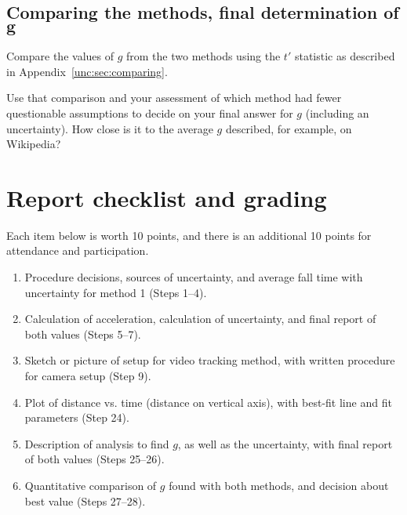 \subsection{Comparing the methods, final determination of $\bm{g}$}

\begin{steps}
	\item Compare the values of $g$ from the two methods using the $t'$ statistic as described in Appendix~\ref{unc:sec:comparing}.
	
	\item Use that comparison and your assessment of which method had fewer questionable assumptions to decide on your final answer for $g$ (including an uncertainty). How close is it to the average $g$ described, for example, on Wikipedia?
\end{steps}

\section{Report checklist and grading}

Each item below is worth 10 points, and there is an additional 10 points for attendance and participation.

\begin{enumerate}
	\item Procedure decisions, sources of uncertainty, and average fall time with uncertainty for method 1 (Steps 1--4).
	
	\item Calculation of acceleration, calculation of uncertainty, and final report of both values (Steps 5--7).
	
	\item Sketch or picture of setup for video tracking method, with written procedure for camera setup (Step 9).
	
	\item Plot of distance vs. time (distance on vertical axis), with best-fit line and fit parameters (Step 24).
	
	\item Description of analysis to find $g$, as well as the uncertainty, with final report of both values (Steps 25--26).
	
	\item Quantitative comparison of $g$ found with both methods, and decision about best value (Steps 27--28).
\end{enumerate}